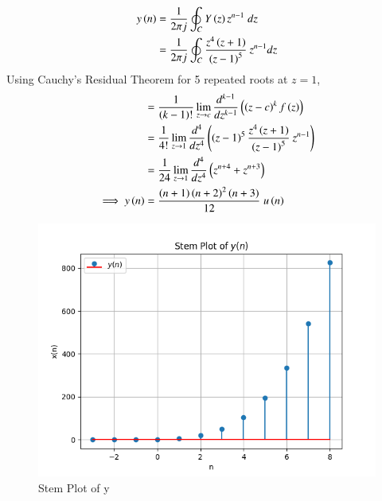 \documentclass[journal,12pt,twocolumn]{IEEEtran}
\theoremstyle{remark}
\begin{document}
\begin{align}
    y\left(n\right)&=\frac{1}{2\pi j}\oint_C Y\left(z\right)z^{n-1}\;dz\\
    &=\frac{1}{2\pi j}\oint_C\frac{z^4\left(z+1\right)}{\left(z-1\right)^5}\:z^{n-1}dz\\
\end{align}
Using Cauchy's Residual Theorem for 5 repeated roots at $z=1$,
\begin{align}
    &=\frac{1}{\left(k-1\right)!} \lim_{z\to c}\frac{d^{k-1}}{dz^{k-1}}\left(\left(z-c\right)^kf\left(z\right)\right)\\
    &=\frac{1}{4!}\lim_{z\to1}\frac{d^4}{dz^4}\left(\left(z-1\right)^5\frac{z^4\left(z+1\right)}{\left(z-1\right)^5}\:z^{n-1}\right)\\
    &=\frac{1}{24}\lim_{z\to1}\frac{d^4}{dz^4}\left(z^{n+4}+z^{n+3}\right)\\
    \implies y\left(n\right)&=\frac{\left(n+1\right)\left(n+2\right)^2\left(n+3\right)}{12}\;u\left(n\right)
\end{align}
\begin{figure}[h!]
    \centering
    \includegraphics[width=1\linewidth]{figs/Figure_1.png}
    \caption{Stem Plot of y}
\end{figure}
\end{document}
